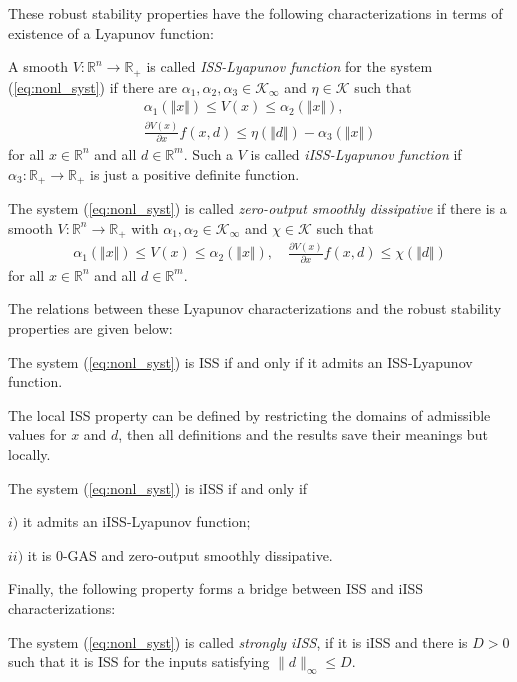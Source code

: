 \documentclass[letterpaper, 10 pt, conference]{ieeeconf}  %
\begin{document}
These robust stability properties have the following characterizations
in terms of existence of a Lyapunov function: 
\begin{defin}
\label{def:LyapISS_iISS} A smooth $V:\mathbb{R}^{n}\to\mathbb{R}_{+}$
is called \emph{ISS-Lyapunov function} for the system (\ref{eq:nonl_syst})
if there are $\alpha_{1},\alpha_{2},\alpha_{3}\in\mathcal{K}_{\infty}$
and $\eta\in\mathcal{K}$ such that 
\begin{gather*}
\alpha_{1}(\Vert x\Vert)\le V(x)\le\alpha_{2}(\Vert x\Vert),\\
\frac{\partial V(x)}{\partial x} f(x,d)\le\eta(\Vert d\Vert)-\alpha_{3}(\Vert x\Vert)
\end{gather*}
for all $x\in\mathbb{R}^{n}$ and all $d\in\mathbb{R}^{m}$. Such
a $V$ is called \emph{iISS-Lyapunov function} if $\alpha_{3}:\mathbb{R}_{+}\to\mathbb{R}_{+}$
is just a positive definite function.
\end{defin}
%
\begin{defin}
The system (\ref{eq:nonl_syst}) is called \emph{zero-output smoothly
dissipative} if there is a smooth $V:\mathbb{R}^{n}\to\mathbb{R}_{+}$
with $\alpha_{1},\alpha_{2}\in\mathcal{K}_{\infty}$ and $\chi\in\mathcal{K}$
such that 
\begin{gather*}
\alpha_{1}(\Vert x\Vert)\le V(x)\le\alpha_{2}(\Vert x\Vert),\quad
\frac{\partial V(x)}{\partial x}f(x,d)\le\chi(\Vert d\Vert)
\end{gather*}
for all $x\in\mathbb{R}^{n}$ and all $d\in\mathbb{R}^{m}$.
\end{defin}
The relations between these Lyapunov characterizations and the robust
stability properties are given below:
\begin{theorem}
\label{thm:ISS_Lyap} The system (\ref{eq:nonl_syst}) is ISS if and
only if it admits an ISS-Lyapunov function.
\end{theorem}
The local ISS property can be defined by restricting the domains of
admissible values for $x$ and $d$, then all definitions and the
results save their meanings but locally.
\begin{theorem}
\label{thm:iISS_Lyap} The system (\ref{eq:nonl_syst}) is iISS if
and only if 

$i)$ it admits an iISS-Lyapunov function;

$ii)$ it is $0$-GAS and zero-output smoothly dissipative.
\end{theorem}
Finally, the following property forms a bridge between ISS and iISS
characterizations:
\begin{defin}
The system (\ref{eq:nonl_syst}) is called \emph{strongly iISS}, if
it is iISS and there is $D>0$ such that it is ISS for the inputs
satisfying $\|d\|_{\infty} \leq D$.
\end{defin}
\end{document}
